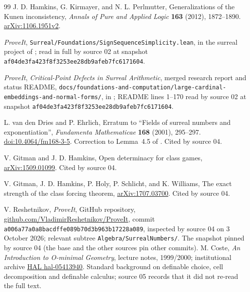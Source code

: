 \documentclass[11pt,a4paper]{article}
\numberwithin{equation}{section}
\theoremstyle{plain}
\theoremstyle{definition}
\theoremstyle{remark}
\newcommand{\code}[1]{\texttt{\small #1}}
\begin{document}
\begin{thebibliography}{99}
J. D. Hamkins, G. Kirmayer, and N. L. Perlmutter,
Generalizations of the Kunen inconsistency,
\emph{Annals of Pure and Applied Logic} \textbf{163} (2012), 1872--1890.
\href{https://arxiv.org/abs/1106.1951v2}{arXiv:1106.1951v2}.

\emph{ProveIt}, \code{Surreal/Foundations/SignSequenceSimplicity.lean}, in the
surreal project of \cite{RepoMain}; read in full by source 02 at snapshot
\code{af04de3fa423f8f3253ee28db9afeb7fc6171604}.

\emph{ProveIt}, \emph{Critical-Point Defects in Surreal Arithmetic}, merged
research report and status README,
\code{docs/foundations-and-computation/large-cardinal-embeddings-and-normal-forms/},
in \cite{RepoMain}; README lines 1--170 read by source 02 at snapshot
\code{af04de3fa423f8f3253ee28db9afeb7fc6171604}.

L. van den Dries and P. Ehrlich,
Erratum to ``Fields of surreal numbers and exponentiation'',
\emph{Fundamenta Mathematicae} \textbf{168} (2001), 295--297.
\href{https://doi.org/10.4064/fm168-3-5}{doi:10.4064/fm168-3-5}.
Correction to Lemma~4.5 of \cite{vdDE}. Cited by source 04.

V. Gitman and J. D. Hamkins, Open determinacy for class games,
\href{https://arxiv.org/abs/1509.01099}{arXiv:1509.01099}.
Cited by source 04.

V. Gitman, J. D. Hamkins, P. Holy, P. Schlicht, and K. Williams,
The exact strength of the class forcing theorem,
\href{https://arxiv.org/abs/1707.03700}{arXiv:1707.03700}.
Cited by source 04.

V. Reshetnikov, \emph{ProveIt}, GitHub repository,
\href{https://github.com/VladimirReshetnikov/ProveIt}{github.com/VladimirReshetnikov/ProveIt},
commit \code{a006a77a0a8bacdffe089b70d3b963b17228a089}, inspected by source 04
on 3 October 2026; relevant subtree \code{Algebra/SurrealNumbers/}.
The snapshot pinned by source 04 (the base and the other sources pin other
commits).
M. Coste, \emph{An Introduction to O-minimal Geometry}, lecture notes,
1999/2000; institutional archive
\href{https://univ-rennes.hal.science/hal-05413940}{HAL hal-05413940}.
Standard background on definable choice, cell decomposition and definable
calculus; source 05 records that it did not re-read the full text.


\end{thebibliography}
\end{document}
